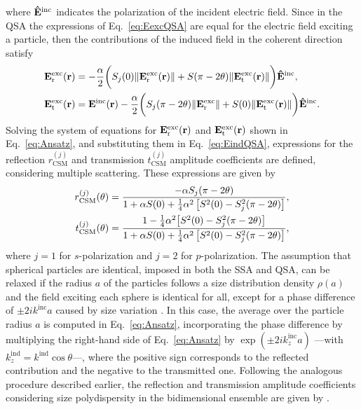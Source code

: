 %
where $\vu{E}^\text{inc}$ indicates the polarization of the incident electric field. Since in the QSA the expressions of Eq.~\eqref{eq:EexcQSA} are equal for the electric field exciting a particle, then the contributions of the induced field in the coherent direction satisfy \cite{garcia2012multiple}
%
\begin{subequations}%
	\begin{align}%
		\vb{E}^\text{exc}_\text{r}(\vb{r}) &= -\frac{\alpha}{2} \bigg( S_j(0) \norm{\vb{E}^\text{exc}_\text{r}(\vb{r})} +  S(\pi-2\theta)\norm{\vb{E}^\text{exc}_\text{t}(\vb{r})}\bigg) \vu{E}^\text{inc},\\
		\vb{E}^\text{exc}_\text{t}(\vb{r}) &= \vb{E}^\text{inc}(\vb{r}) -\frac{\alpha}{2} \bigg( S_j(\pi-2\theta) \norm{\vb{E}^\text{exc}_\text{r}} + S(0)\norm{\vb{E}^\text{exc}_\text{t}(\vb{r})} \bigg)
		\vu{E}^\text{inc}.
	\end{align}%
	\label{eq:Ansatz}%
\end{subequations}%
%
Solving the system of equations for $\vb{E}^\text{exc}_\text{r}(\vb{r})$ and $\vb{E}^\text{exc}_\text{t}(\vb{r})$ shown in Eq.~\eqref{eq:Ansatz}, and substituting them in Eq.~\eqref{eq:EindQSA}, expressions for the reflection $r^{(j)}_\text{CSM}$ and transmission $t^{(j)}_\text{CSM}$ amplitude coefficients are defined, considering multiple scattering. These expressions are given by \cite{garcia2012multiple,barrera_coherent_2003}
%
\begin{subequations}%
	\begin{align}
		r^{(j)}_\text{CSM}(\theta)&=\frac{-\alpha S_j(\pi-2\theta)}
		{1+\alpha S(0)+\frac14 \alpha^2 \left[S^2(0)-S_j^2 (\pi-2\theta) \right]},\\
		t^{(j)}_\text{CSM}(\theta)&=\frac{1-\frac14\alpha^2\qty[S^2(0)-S_j^2(\pi-2\theta)]}
		{1+\alpha S(0)+\frac14 \alpha^2 \left[S^2(0)-S_j^2 (\pi-2\theta) \right]},
	\end{align}%
	\label{eq:CSMmono}%
\end{subequations}%
%
where $j=1$ for $s$-polarization and $j=2$ for $p$-polarization. The assumption that spherical particles are identical, imposed in both the SSA and QSA, can be relaxed if the radius $a$ of the particles follows a size distribution density $\rho(a)$ and the field exciting each sphere is identical for all, except for a phase difference of $\pm2ik^\text{inc}a$ caused by size variation \cite{vazquez-estrada_optical_2014}. In this case, the average over the particle radius $a$ is computed in Eq.~\eqref{eq:Ansatz}, incorporating the phase difference by multiplying the right-hand side of Eq.~\eqref{eq:Ansatz} by $\exp(\pm2ik_z^\text{inc} a)$ ---with $k_z^\text{ind} = k^\text{ind}\cos\theta$---, where the positive sign corresponds to the reflected contribution and the negative to the transmitted one. Following the analogous procedure described earlier, the reflection and transmission amplitude coefficients considering size polydispersity in the bidimensional ensemble are given by \cite{vazquez-estrada_optical_2014}.
